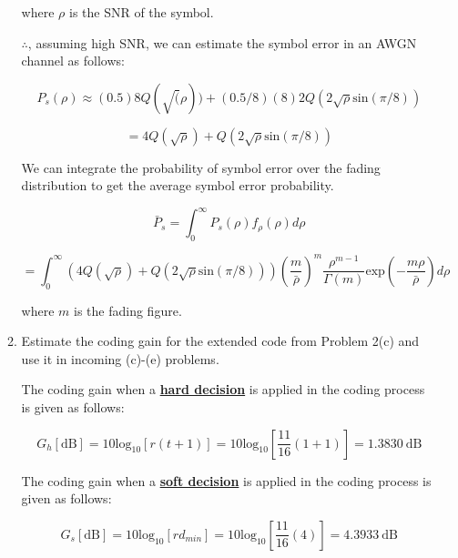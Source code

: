 \documentclass[fleqn]{article}
\begin{document}
\begin{enumerate}
\begin{enumerate}
			where $\rho$ is the SNR of the symbol.
			
			$\therefore$, assuming high SNR, we can estimate the symbol error in an AWGN channel as follows:
			
			\begin{equation*}
				P_s(\rho) \approx (0.5)8Q(\sqrt(\rho)) + (0.5/8)(8)2Q(2\sqrt{\rho}\text{sin}(\pi/8))
			\end{equation*}
			
			\begin{equation*}
				= 4Q(\sqrt{\rho}) + Q(2\sqrt{\rho}\text{sin}(\pi/8))
			\end{equation*}
			
			We can integrate the probability of symbol error over the fading distribution to get the average symbol error probability.
			
			\begin{equation*}
				\bar{P}_s = \int_{0}^{\infty}{P_s(\rho)f_{\rho}(\rho)d\rho}
			\end{equation*}
			
			\begin{equation*}
				= \int_{0}^{\infty}{(4Q(\sqrt{\rho}) + Q(2\sqrt{\rho}\text{sin}(\pi/8)))\left(\frac{m}{\bar{\rho}}\right)^m\frac{\rho^{m-1}}{\Gamma(m)}\text{exp}\left(-\frac{m\rho}{\bar{\rho}}\right)d\rho}
			\end{equation*}
			
			where $m$ is the fading figure.
			
			\item Estimate the coding gain for the extended code from Problem 2(c) and use it in incoming (c)-(e) problems.
			
			The coding gain when a \textbf{\underline{hard decision}} is applied in the coding process is given as follows:
			
			\begin{equation*}
				G_h[\text{dB}] = 10\text{log}_{10}[r(t+1)] = 10\text{log}_10\left[\frac{11}{16}(1+1)\right] = 1.3830 \ \text{dB}
			\end{equation*}
				
			The coding gain when a \textbf{\underline{soft decision}} is applied in the coding process is given as follows:
			
			\begin{equation*}
				G_s[\text{dB}] = 10\text{log}_{10}[rd_{min}] = 10\text{log}_10\left[\frac{11}{16}(4)\right] = 4.3933 \ \text{dB}
			\end{equation*}
			

\end{enumerate}
\end{enumerate}
\end{document}
